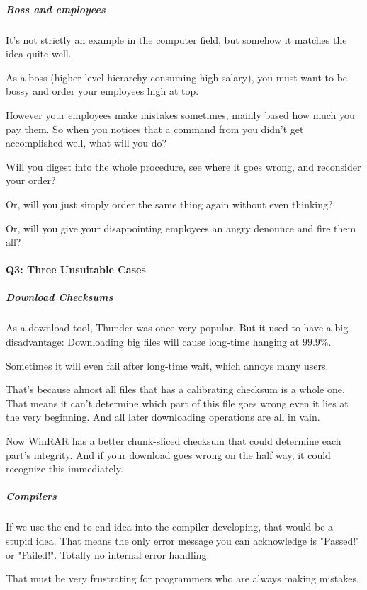 \documentclass[
]{article}
\begin{document}
\hypertarget{header-n107}{%
\subparagraph{Boss and employees}\label{header-n107}}

It's not strictly an example in the computer field, but somehow it
matches the idea quite well.

As a boss (higher level hierarchy consuming high salary), you must want
to be bossy and order your employees high at top.

However your employees make mistakes sometimes, mainly based how much
you pay them. So when you notices that a command from you didn't get
accomplished well, what will you do?

Will you digest into the whole procedure, see where it goes wrong, and
reconsider your order?

Or, will you just simply order the same thing again without even
thinking?

Or, will you give your disappointing employees an angry denounce and
fire them all?

\hypertarget{header-n122}{%
\paragraph{Q3: Three Unsuitable Cases}\label{header-n122}}

\hypertarget{header-n125}{%
\subparagraph{Download Checksums}\label{header-n125}}

As a download tool, Thunder was once very popular. But it used to have a
big disadvantage: Downloading big files will cause long-time hanging at
\(99.9\%\).

Sometimes it will even fail after long-time wait, which annoys many
users.

That's because almost all files that has a calibrating checksum is a
whole one. That means it can't determine which part of this file goes
wrong even it lies at the very beginning. And all later downloading
operations are all in vain.

Now WinRAR has a better chunk-sliced checksum that could determine each
part's integrity. And if your download goes wrong on the half way, it
could recognize this immediately.

\hypertarget{header-n140}{%
\subparagraph{Compilers}\label{header-n140}}

If we use the end-to-end idea into the compiler developing, that would
be a stupid idea. That means the only error message you can acknowledge
is "Passed!" or "Failed!". Totally no internal error handling.

That must be very frustrating for programmers who are always making
mistakes.
\end{document}
